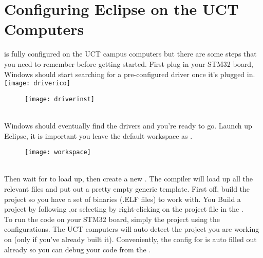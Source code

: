 \section{Configuring Eclipse on the UCT Computers}
\label{sec:EclipseConfig}
 is fully configured on the UCT campus computers but there are some steps that you need to remember before getting started. First plug in your STM32 board, Windows should start searching for a pre-configured driver once it's plugged in.\texttt{[image: driverico]}\\
\begin{figure}[htbp]
\centering
\texttt{[image: driverinst]}
\end{figure}
\\
Windows should eventually find the drivers and you're ready to go. Launch up Eclipse, it is important you leave the default workspace as .
\begin{figure}[htbp]
\centering
\texttt{[image: workspace]}
\end{figure}
\\
Then wait for  to load up, then create a new . The compiler will load up all the relevant files and put out a pretty empty generic template. First off, build the project so you have a set of binaries (.ELF files) to work with. You Build a project by following  ,or selecting  by right-clicking on the project file in the .
\\
To run the code on your STM32 board, simply  the project using the  configurations. The UCT computers will auto detect the project you are working on (only if you've already built it). Conveniently, the config for  is auto filled out already so you can debug your code from the .
\par
{
\centering
{}}
\newpage

